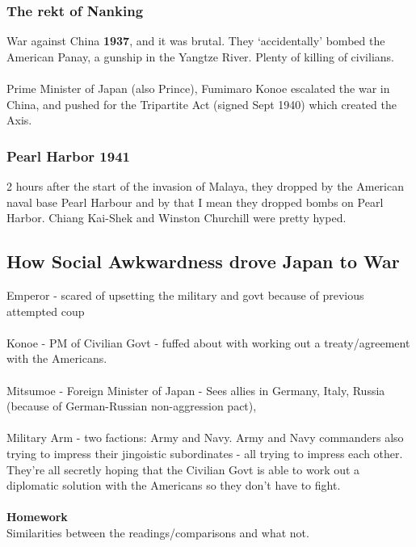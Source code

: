 \documentclass[a4paper]{article}
\begin{document}
\subsubsection{The rekt of Nanking}
War against China \textbf{1937}, and it was brutal. They `accidentally' bombed the American Panay, a gunship in the Yangtze River. Plenty of killing of civilians.\\
\\
Prime Minister of Japan (also Prince), Fumimaro Konoe escalated the war in China, and pushed for the Tripartite Act (signed Sept 1940) which created the Axis.
\subsubsection{Pearl Harbor 1941}
2 hours after the start of the invasion of Malaya, they dropped by the American naval base Pearl Harbour and by that I mean they dropped bombs on Pearl Harbor. Chiang Kai-Shek and Winston Churchill were pretty hyped.
\subsection{How Social Awkwardness drove Japan to War}
Emperor - scared of upsetting the military and govt because of previous attempted coup\\
\\
Konoe - PM of Civilian Govt - fuffed about with working out a treaty/agreement with the Americans.\\
\\
Mitsumoe - Foreign Minister of Japan - Sees allies in Germany, Italy, Russia (because of German-Russian non-aggression pact),\\
\\
Military Arm - two factions: Army and Navy. Army and Navy commanders also trying to impress their jingoistic subordinates - all trying to impress each other. They're all secretly hoping that the Civilian Govt is able to work out a diplomatic solution with the Americans so they don't have to fight.\\
\\
\textbf{Homework}\\
Similarities between the readings/comparisons and what not.
\end{document}
